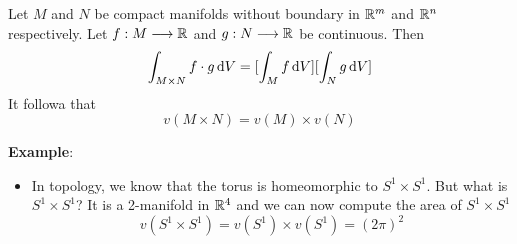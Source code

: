\begin{theorem*}
    Let $M$ and $N$ be compact manifolds without boundary in $\mathbb{R}^m$ and $\mathbb{R}^n$ respectively. Let $f:M\longrightarrow \mathbb{R}$ and $g:N\longrightarrow \mathbb{R}$ be continuous. Then 
    $$\int_{M\times N}f\cdot g \operatorname{d\!} V=[\int_Mf\operatorname{d\!} V][\int_Ng\operatorname{d\!} V]$$
    It followa that $$v(M\times N)=v(M)\times v(N)$$
\end{theorem*}
\noindent\textbf{Example}:
\begin{itemize}
    \item In topology, we know that the torus is homeomorphic to $S^1\times S^1$. But what is $S^1\times S^1$? It is a 2-manifold in $\mathbb{R}^4$ and we can now compute the area of $S^1\times S^1$
    $$v(S^1\times S^1)=v(S^1)\times v(S^1)=(2\pi)^2$$
\end{itemize}